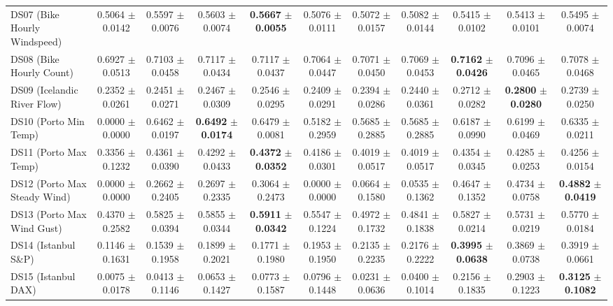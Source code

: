 \begin{table}[t]
{{\begin{tabular}{lcccccccccc}
DS07 (Bike Hourly Windspeed) & 0.5064 $\pm$ 0.0142 & 0.5597 $\pm$ 0.0076 & 0.5603 $\pm$ 0.0074 & \textbf{0.5667} $\pm$ \textbf{0.0055} & 0.5076 $\pm$ 0.0111 & 0.5072 $\pm$ 0.0157 & 0.5082 $\pm$ 0.0144 & 0.5415 $\pm$ 0.0102 & 0.5413 $\pm$ 0.0101 & 0.5495 $\pm$ 0.0074 \\
DS08 (Bike Hourly Count) & 0.6927 $\pm$ 0.0513 & 0.7103 $\pm$ 0.0458 & 0.7117 $\pm$ 0.0434 & 0.7117 $\pm$ 0.0437 & 0.7064 $\pm$ 0.0447 & 0.7071 $\pm$ 0.0450 & 0.7069 $\pm$ 0.0453 & \textbf{0.7162} $\pm$ \textbf{0.0426} & 0.7096 $\pm$ 0.0465 & 0.7078 $\pm$ 0.0468 \\
DS09 (Icelandic River Flow) & 0.2352 $\pm$ 0.0261 & 0.2451 $\pm$ 0.0271 & 0.2467 $\pm$ 0.0309 & 0.2546 $\pm$ 0.0295 & 0.2409 $\pm$ 0.0291 & 0.2394 $\pm$ 0.0286 & 0.2440 $\pm$ 0.0361 & 0.2712 $\pm$ 0.0282 & \textbf{0.2800} $\pm$ \textbf{0.0280} & 0.2739 $\pm$ 0.0250 \\
DS10 (Porto Min Temp) & 0.0000 $\pm$ 0.0000 & 0.6462 $\pm$ 0.0197 & \textbf{0.6492} $\pm$ \textbf{0.0174} & 0.6479 $\pm$ 0.0081 & 0.5182 $\pm$ 0.2959 & 0.5685 $\pm$ 0.2885 & 0.5685 $\pm$ 0.2885 & 0.6187 $\pm$ 0.0990 & 0.6199 $\pm$ 0.0469 & 0.6335 $\pm$ 0.0211 \\
DS11 (Porto Max Temp) & 0.3356 $\pm$ 0.1232 & 0.4361 $\pm$ 0.0390 & 0.4292 $\pm$ 0.0433 & \textbf{0.4372} $\pm$ \textbf{0.0352} & 0.4186 $\pm$ 0.0301 & 0.4019 $\pm$ 0.0517 & 0.4019 $\pm$ 0.0517 & 0.4354 $\pm$ 0.0345 & 0.4285 $\pm$ 0.0253 & 0.4256 $\pm$ 0.0154 \\
DS12 (Porto Max Steady Wind) & 0.0000 $\pm$ 0.0000 & 0.2662 $\pm$ 0.2405 & 0.2697 $\pm$ 0.2335 & 0.3064 $\pm$ 0.2473 & 0.0000 $\pm$ 0.0000 & 0.0664 $\pm$ 0.1580 & 0.0535 $\pm$ 0.1362 & 0.4647 $\pm$ 0.1352 & 0.4734 $\pm$ 0.0758 & \textbf{0.4882} $\pm$ \textbf{0.0419} \\
DS13 (Porto Max Wind Gust) & 0.4370 $\pm$ 0.2582 & 0.5825 $\pm$ 0.0394 & 0.5855 $\pm$ 0.0344 & \textbf{0.5911} $\pm$ \textbf{0.0342} & 0.5547 $\pm$ 0.1224 & 0.4972 $\pm$ 0.1732 & 0.4841 $\pm$ 0.1838 & 0.5827 $\pm$ 0.0214 & 0.5731 $\pm$ 0.0219 & 0.5770 $\pm$ 0.0184 \\
DS14 (Istanbul S\&P) & 0.1146 $\pm$ 0.1631 & 0.1539 $\pm$ 0.1958 & 0.1899 $\pm$ 0.2021 & 0.1771 $\pm$ 0.1980 & 0.1953 $\pm$ 0.1950 & 0.2135 $\pm$ 0.2235 & 0.2176 $\pm$ 0.2222 & \textbf{0.3995} $\pm$ \textbf{0.0638} & 0.3869 $\pm$ 0.0738 & 0.3919 $\pm$ 0.0661 \\
DS15 (Istanbul DAX) & 0.0075 $\pm$ 0.0178 & 0.0413 $\pm$ 0.1146 & 0.0653 $\pm$ 0.1427 & 0.0773 $\pm$ 0.1587 & 0.0796 $\pm$ 0.1448 & 0.0231 $\pm$ 0.0636 & 0.0400 $\pm$ 0.1014 & 0.2156 $\pm$ 0.1835 & 0.2903 $\pm$ 0.1223 & \textbf{0.3125} $\pm$ \textbf{0.1082} \\

\end{tabular}}}
\end{table}
